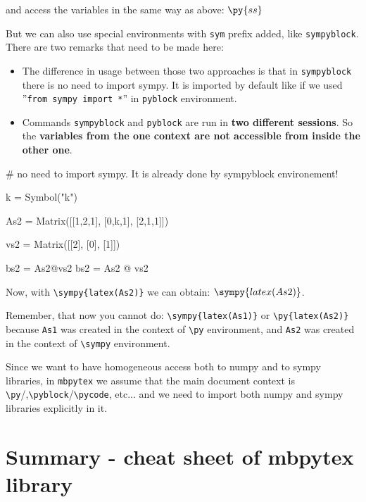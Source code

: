 \documentclass[11pt]{article}
\newcommand{\mtx}[1]{\py{mbp.matrix(#1)}}
\newcommand{\mtxb}[1]{\py{mbp.matrix(#1)}}
\begin{document}
and access the variables in the same way as above: $\py{ss}$

But we can also use special environments with \verb|sym| prefix added, like \verb|sympyblock|. There are two remarks that need to be made here:
\begin{itemize}
\item The difference in usage between those two approaches is that in \verb|sympyblock| there is no need to import sympy. It is imported by default like if we used ''\verb|from sympy import *|'' in \verb|pyblock| environment.

\item Commands \verb|sympyblock| and \verb|pyblock| are run in {\bf two different sessions}. So the {\bf variables from the one context are not accessible from inside the other one}.
\end{itemize}


\begin{sympyblock}
# no need to import sympy. It is already done by sympyblock environement!

k = Symbol("k")

As2 = Matrix([[1,2,1],
              [0,k,1],
              [2,1,1]])
              
vs2 = Matrix([[2],
              [0],
              [1]])

bs2 = As2@vs2
bs2 = As2 @ vs2
\end{sympyblock}

Now, with \verb|\sympy{latex(As2)}| we can obtain:
$\sympy{latex(As2)}$.

Remember, that now you cannot do:
\verb|\sympy{latex(As1)}| or \verb|\py{latex(As2)}| because \verb|As1| was created in the context of \verb|\py| environment, and \verb|As2| was created in the context of \verb|\sympy| environment. 

Since we want to have homogeneous access both to numpy and to sympy libraries, in \verb|mbpytex| we assume that the main document context is \verb|\py|/,\verb|\pyblock|/\verb|\pycode|, etc... and we need to import both numpy and sympy libraries explicitly in it.

\section{Summary - cheat sheet of mbpytex library}

%
%
%
%
%
%
\end{document}
